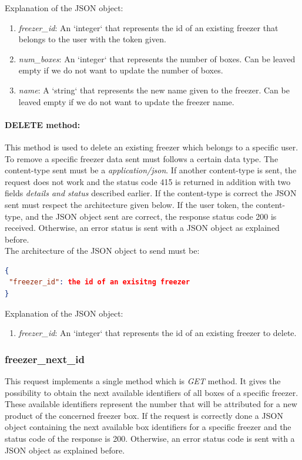 Explanation of the  JSON object:
\begin{enumerate}
\item \textit{freezer\_id}: An `integer` that represents the id of an existing freezer that belongs to the user with the token given.
\item \textit{num\_boxes}: An `integer` that represents the number of boxes. Can be leaved empty if we do not want to update the number of boxes.
\item \textit{name}: A `string` that represents the new name given to the freezer. Can be leaved empty if we do not want to update the freezer name.
\end{enumerate}

\paragraph{DELETE method:} This method is used to delete an existing freezer which belongs to a specific user. To remove a specific freezer data sent must follows a certain data type.  The content-type sent must be a \textit{application/json}. If another content-type is sent, the request does not work and the status code 415 is returned in addition with two fields \textit{details and status} described earlier. If the content-type is correct the JSON sent must respect the architecture given below. If the user token, the content-type, and the JSON object sent are correct, the response status code 200 is received. Otherwise, an error status is sent with a JSON object as explained before.\\

The architecture of the JSON object to send must be:
\begin{lstlisting}[language=json]
{
 "freezer_id": the id of an exisitng freezer
}
\end{lstlisting}

Explanation of the  JSON object:
\begin{enumerate}
\item \textit{freezer\_id}: An `integer` that represents the id of an existing freezer to delete.
\end{enumerate}

\subsubsection{freezer\_next\_id}
This request implements a single method which is \textit{GET} method. It gives the possibility to obtain the next available identifiers of all boxes of a specific freezer. These available identifiers represent the number that will be attributed for a new product of the concerned freezer box. If the request is correctly done a JSON object containing the next available box identifiers for a specific freezer and the status code of the response is 200. Otherwise, an error status code is sent with a JSON object as explained before.\\

